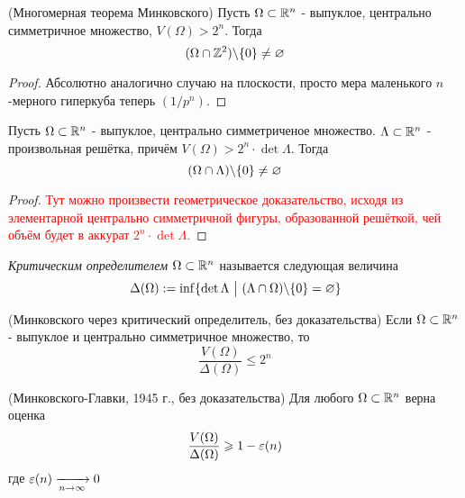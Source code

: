 \begin{theorem} (Многомерная теорема Минковского)
	Пусть $\Omega \subset \mathbb{R}^n$ - выпуклое, центрально симметричное множество, $V(\Omega) > 2^n$. Тогда
	\[
		(\Omega \cap \mathbb{Z}^2) \backslash \{0\} \neq \varnothing
	\]
\end{theorem}

\begin{proof}
	Абсолютно аналогично случаю на плоскости, просто мера маленького $n$-мерного гиперкуба теперь $(1/p^n)$.
\end{proof}

\begin{theorem}
	Пусть $\Omega \subset \mathbb{R}^n$ - выпуклое, центрально симметриченое множество. $\Lambda \subset \mathbb{R}^n$ - произвольная решётка, причём $V(\Omega) > 2^n \cdot \det \Lambda$. Тогда
	\[
		(\Omega \cap \Lambda) \backslash \{0\} \neq \varnothing
	\]
\end{theorem}

\begin{proof}
	\textcolor{red}{Тут можно произвести геометрическое доказательство, исходя из элементарной центрально симметричной фигуры, образованной решёткой, чей объём будет в аккурат $2^n \cdot \det \Lambda$.}
\end{proof}

\begin{definition}
	\textit{Критическим определителем} $\Omega \subset \mathbb{R}^n$ называется следующая величина
	\[
		\Delta(\Omega) := \inf \{\det \Lambda \ \big|\  (\Lambda \cap \Omega) \backslash \{0\} = \varnothing\}
	\]
\end{definition}

\begin{theorem} (Минковского через критический определитель, без доказательства)
	Если $\Omega \subset \mathbb{R}^n$ - выпуклое и центрально симметричное множество, то
	\[
		\frac{V(\Omega)}{\Delta(\Omega)} \le 2^n
	\]
\end{theorem}

\begin{theorem} (Минковского-Главки, 1945 г., без доказательства)
	Для любого $\Omega \subset \mathbb{R}^n$ верна оценка
	\[
		\frac{V(\Omega)}{\Delta(\Omega)} \geqslant 1 - \varepsilon(n)
	\]
	где $\varepsilon(n) \xrightarrow[n \to \infty]{} 0$
\end{theorem}

